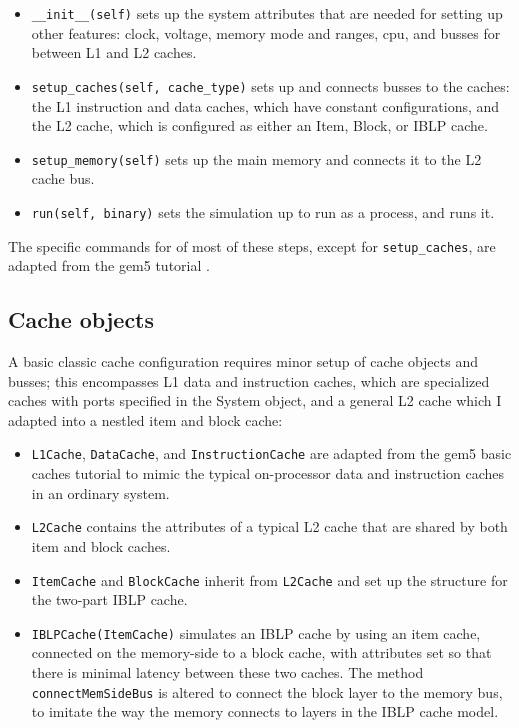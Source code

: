 \documentclass[12pt,twoside]{reedthesis}
\begin{document}
	\begin{itemize}
		\item \verb`__init__(self)` sets up the system attributes that are needed for setting up other features: clock, voltage, memory mode and ranges, cpu, and busses for between L1 and L2 caches.
	
		\item \verb`setup_caches(self, cache_type)` sets up and connects busses to the caches: the L1 instruction and data caches, which have constant configurations, and the L2 cache, which is configured as either an Item, Block, or IBLP cache.
	
		\item \verb`setup_memory(self)` sets up the main memory and connects it to the L2 cache bus.
	
		\item \verb`run(self, binary)` sets the simulation up to run as a process, and runs it.
	\end{itemize}

	The specific commands for of most of these steps, except for \verb`setup_caches`, are adapted from the gem5 tutorial \cite{gem5-tutorial}.

	\subsection*{Cache objects}

	A basic classic cache configuration requires minor setup of cache objects and busses; this encompasses L1 data and instruction caches, which are specialized caches with ports specified in the System object, and a general L2 cache which I adapted into a nestled item and block cache:

	\begin{itemize}
		\item \verb`L1Cache`, \verb`DataCache`, and \verb`InstructionCache` are adapted from the gem5 basic caches tutorial to mimic the typical on-processor data and instruction caches in an ordinary system.
	
		\item \verb`L2Cache` contains the attributes of a typical L2 cache that are shared by both item and block caches.
	
		\item \verb`ItemCache` and \verb`BlockCache` inherit from \verb`L2Cache` and set up the structure for the two-part IBLP cache.
	
		\item \verb`IBLPCache(ItemCache)` simulates an IBLP cache by using an item cache, connected on the memory-side to a block cache, with attributes set so that there is minimal latency between these two caches. The method \verb`connectMemSideBus` is altered to connect the block layer to the memory bus, to imitate the way the memory connects to layers in the IBLP cache model.
	\end{itemize}
\end{document}
